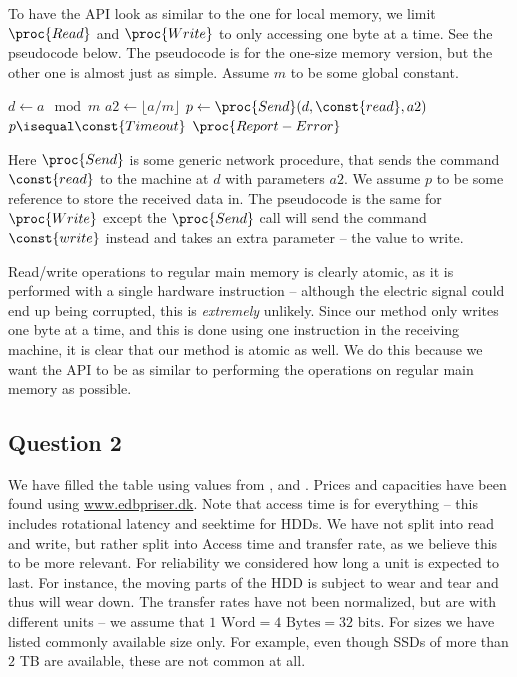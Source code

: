 \documentclass[a4paper,final]{article}
\begin{document}
To have the API look as similar to the one for local memory, we limit
$\proc{Read}$ and $\proc{Write}$ to only accessing one byte at a time. See the
pseudocode below. The pseudocode is for the one-size memory version, but the
other one is almost just as simple. Assume $m$ to be some global constant.

\begin{codebox}
    \li $d\gets a\mod m$
    \li $a2\gets \lfloor a/m \rfloor$
    \li $p\gets\proc{Send}(d, \const{read}, a2)$
    \li \If $p \isequal \const{Timeout}$
    \li \Then
            $\proc{Report-Error}$
        \End
\end{codebox}

Here $\proc{Send}$ is some generic network procedure, that sends the command
$\const{read}$ to the machine at $d$ with parameters $a2$. We assume $p$ to
be some reference to store the received data in. The pseudocode
is the same for $\proc{Write}$ except the $\proc{Send}$ call will send the
command $\const{write}$ instead and takes an extra parameter -- the value to
write.

Read/write operations to regular main memory is clearly atomic, as it is
performed with a single hardware instruction -- although the electric signal
could end up being corrupted, this is \emph{extremely} unlikely. Since our
method only writes one byte at a time, and this is done using one instruction
in the receiving machine, it is clear that our method is atomic as well. We do
this because we want the API to be as similar to performing the operations on
regular main memory as possible.


\subsection*{Question 2}

We have filled the table using values from \cite{WikiSSDHDD}, \cite{WikiDRAM}
and \cite{PowerConsump}. Prices and capacities have been found using
\url{www.edbpriser.dk}. Note that access time is for everything -- this
includes rotational latency and seektime for HDDs. We have not split into read
and write, but rather split into Access time and transfer rate, as we believe
this to be more relevant. For reliability we considered how long a unit is
expected to last. For instance, the moving parts of the HDD is subject to wear
and tear and thus will wear down. The transfer rates have not been normalized,
but are with different units -- we assume that $1\text{ Word} = 4\text{ Bytes}
= 32\text{ bits}$. For sizes we have listed commonly available size only. For
example, even though SSDs of more than $2$ TB are available, these are not
common at all.
\end{document}
